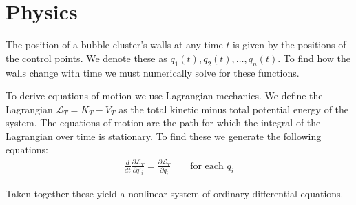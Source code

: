 \documentclass{article}
\begin{document}
\section{Physics}
The position of a bubble cluster's walls at any time $t$ is given by the
positions of the control points. We denote these as
$q_1(t),q_2(t),\dots,q_n(t)$. To find how the walls change with time we must
numerically solve for these functions.

To derive equations of motion we use Lagrangian mechanics. We define the
Lagrangian $\mathcal{L}_T=K_T-V_T$ as the total kinetic minus total potential
energy of the system. The equations of motion are the path for which the
integral of the Lagrangian over time is stationary. To find these we generate
the following equations:
\begin{align}
\frac{d}{d t}\frac{\partial \mathcal{L}_T}{\partial q'_i}
=\frac{\partial
\mathcal{L}_T}{\partial q_i} \qquad \text{for each } q_i
\end{align} 

Taken together these yield a nonlinear system of ordinary differential
equations.
\end{document}
